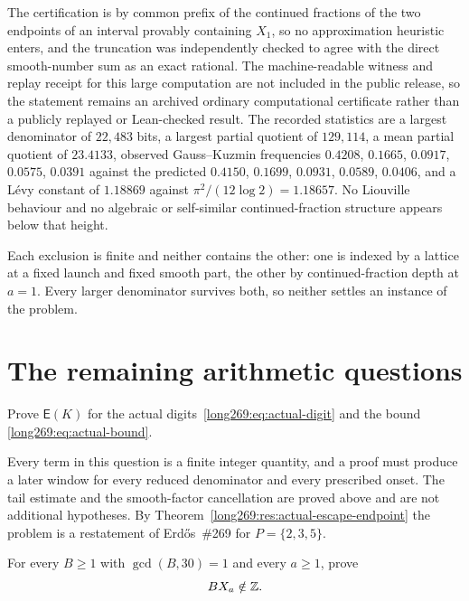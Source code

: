 \documentclass[11pt]{article}
\newcommand{\Esc}{\mathsf E}
\begin{document}
The certification is by common prefix of the continued fractions of the two
endpoints of an interval provably containing $X_1$, so no approximation
heuristic enters, and the truncation was independently checked to agree with
the direct smooth-number sum as an exact rational. The machine-readable witness and replay receipt for this large computation are not included in the public release, so the statement remains an archived ordinary computational certificate rather than a publicly replayed or Lean-checked result.  The recorded statistics are
a largest denominator of $22{,}483$ bits, a largest partial quotient of
$129{,}114$, a mean partial quotient of $23.4133$, observed Gauss--Kuzmin
frequencies $0.4208$, $0.1665$, $0.0917$, $0.0575$, $0.0391$ against the
predicted $0.4150$, $0.1699$, $0.0931$, $0.0589$, $0.0406$, and a L\'evy
constant of $1.18869$ against $\pi^{2}/(12\log2)=1.18657$.  No Liouville
behaviour and no algebraic or self-similar continued-fraction structure appears
below that height.

Each exclusion is finite and neither contains the other: one is indexed by a
lattice at a fixed launch and fixed smooth part, the other by continued-fraction
depth at $a=1$.  Every larger denominator survives both, so neither settles an
instance of the problem.

\section{The remaining arithmetic questions}\label{long269:sec:open}

\begin{problem}\label{long269:prob:producer}
Prove $\Esc(K)$ for the actual digits~\eqref{long269:eq:actual-digit} and the bound
\eqref{long269:eq:actual-bound}.
\end{problem}

Every term in this question is a finite integer quantity, and a proof must
produce a later window for every reduced denominator and every prescribed
onset.  The tail estimate and the smooth-factor cancellation are proved above
and are not additional hypotheses.  By
Theorem~\ref{long269:res:actual-escape-endpoint} the problem is a restatement of
Erd\H{o}s~\#269 for $P=\{2,3,5\}$.

\begin{problem}\label{long269:prob:tails269}
For every $B\ge1$ with $\gcd(B,30)=1$ and every $a\ge1$, prove
\begin{equation}\label{long269:eq:tail-nonintegrality}
 BX_a\notin\Z .
\end{equation}
\end{problem}
\end{document}
